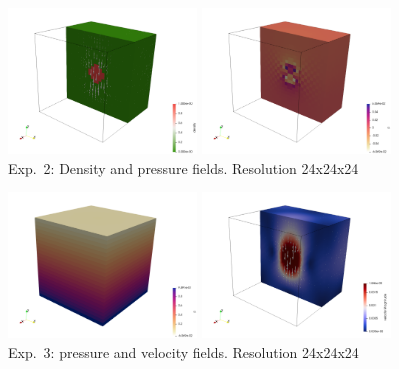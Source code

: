\begin{center}
\includegraphics[width=5cm]{python_codes/fieldstone_10/results/exp2/dens_2}
\includegraphics[width=5cm]{python_codes/fieldstone_10/results/exp2/press_2}\\
{\small Exp.~2: Density and pressure fields. Resolution 24x24x24}
\end{center}


\begin{center}
\includegraphics[width=5cm]{python_codes/fieldstone_10/results/exp3/press_3}
\includegraphics[width=5cm]{python_codes/fieldstone_10/results/exp3/vel_3}\\
{\small Exp.~3: pressure and velocity fields. Resolution 24x24x24}
\end{center}

